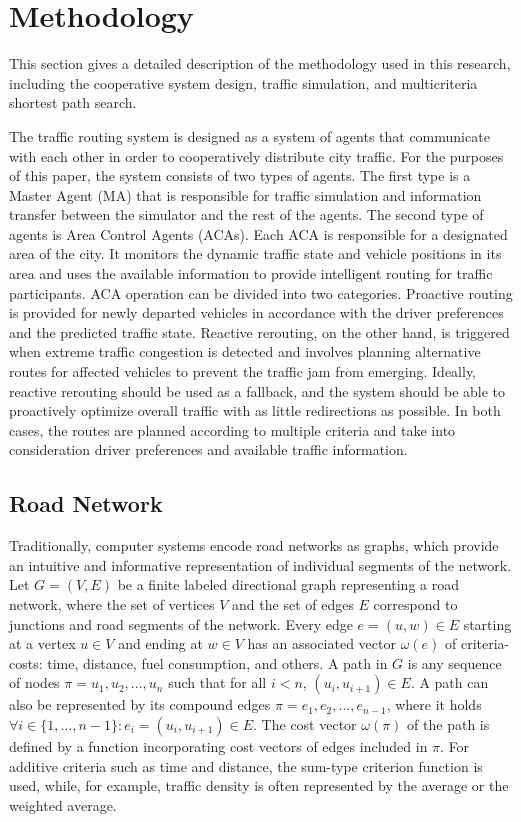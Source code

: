 \documentclass[sigconf]{aamas}
\begin{document}
\section{Methodology}
This section gives a detailed description of the methodology used in this research, including the cooperative system design, traffic simulation, and multicriteria shortest path search.

The traffic routing system is designed as a system of agents that communicate with each other in order to cooperatively distribute city traffic. For the purposes of this paper, the system consists of two types of agents. The first type is a Master Agent (MA) that is responsible for traffic simulation and information transfer between the simulator and the rest of the agents. The second type of agents is Area Control Agents (ACAs). Each ACA is responsible for a designated area of the city. It monitors the dynamic traffic state and vehicle positions in its area and uses the available information to provide intelligent routing for traffic participants. ACA operation can be divided into two categories. Proactive routing is provided for newly departed vehicles in accordance with the driver preferences and the predicted traffic state. Reactive rerouting, on the other hand, is triggered when extreme traffic congestion is detected and involves planning alternative routes for affected vehicles to prevent the traffic jam from emerging. Ideally, reactive rerouting should be used as a fallback, and the system should be able to proactively optimize overall traffic with as little redirections as possible. In both cases, the routes are planned according to multiple criteria and take into consideration driver preferences and available traffic information.

\subsection{Road Network}
Traditionally, computer systems encode road networks as graphs, which provide an intuitive and informative representation of individual segments of the network. Let $G = (V, E)$ be a finite labeled directional graph representing a road network, where the set of vertices $V$ and the set of edges $E$ correspond to junctions and road segments of the network. Every edge $e = (u, w) \in E$ starting at a vertex $u \in V$ and ending at $w \in V$ has an associated vector $\omega(e)$ of criteria-costs: time, distance, fuel consumption, and others. A path in $G$ is any sequence of nodes $\pi = u_1, u_2, ..., u_n$ such that for all $i < n$, $(u_i, u_{i+1}) \in E$. A path can also be represented by its compound edges $\pi = e_1, e_2, ..., e_{n-1}$, where it holds $\forall i \in \{1, ..., n-1\}: e_i = (u_i, u_{i+1}) \in E$. The cost vector $\omega(\pi)$ of the path is defined by a function incorporating cost vectors of edges included in $\pi$. For additive criteria such as time and distance, the sum-type criterion function is used, while, for example, traffic density is often represented by the average or the weighted average.
\end{document}

